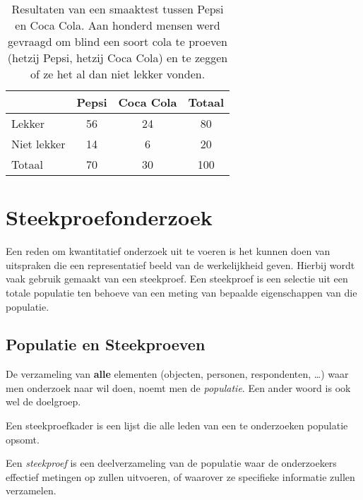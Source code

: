 \begin{table}
  \centering
  \begin{tabular}{l|cc|c}
  	            & Pepsi & Coca Cola & Totaal \\
  	\midrule
  	Lekker      &  56   &    24     &   80   \\
  	Niet lekker &  14   &     6     &   20   \\
  	\midrule
  	Totaal      &  70   &    30     &  100
  \end{tabular}
  \caption[Resultaten van een smaaktest tussen Pepsi en Coca Cola.]{Resultaten van een smaaktest tussen Pepsi en Coca Cola. Aan honderd mensen werd gevraagd om blind een soort cola te proeven (hetzij Pepsi, hetzij Coca Cola) en te zeggen of ze het al dan niet lekker vonden.}
  \label{tab:pepsi-coca}
\end{table}

\section{Steekproefonderzoek}
\label{sec:steekproefonderzoek}

Een reden om kwantitatief onderzoek uit te voeren is het kunnen doen van uitspraken die een representatief beeld van de werkelijkheid geven. Hierbij wordt vaak gebruik gemaakt van een steekproef. Een steekproef is een selectie uit een totale populatie ten behoeve van een meting van bepaalde eigenschappen van die populatie.

\subsection{Populatie en Steekproeven}

\begin{definition}[Populatie]
  De verzameling van \textbf{alle} elementen (objecten, personen, respondenten, \ldots) waar men onderzoek naar wil doen, noemt men de \emph{populatie}. Een ander woord is ook wel de doelgroep.
\end{definition}

\begin{definition}[Steekproefkader]
  Een steekproefkader is een lijst die alle leden van een te onderzoeken populatie opsomt.
\end{definition}

\begin{definition}[Steekproef]
  Een \emph{steekproef} is een deelverzameling van de populatie waar de onderzoekers effectief metingen op zullen uitvoeren, of waarover ze specifieke informatie zullen verzamelen.
\end{definition}

